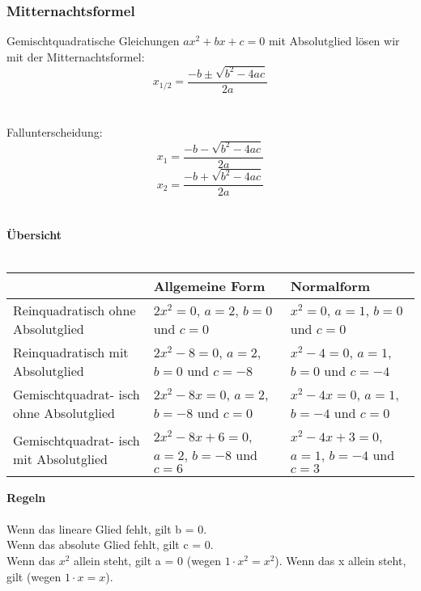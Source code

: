 \begin{multicols}{2}
    \subsubsection{Mitternachtsformel}
    \vspace{-4mm}
    Gemischtquadratische Gleichungen $ax^2 + bx + c = 0$ mit Absolutglied lösen wir mit der Mitternachtsformel:
    \[x_{1/2} = \frac{-b \pm \sqrt{b^2 - 4ac}}{2a}\]\\~\\
    Fallunterscheidung:
    \[x_{1} = \dfrac{-b - \sqrt{b^2 - 4ac}}{2a}\]
    \[x_{2} = \dfrac{-b + \sqrt{b^2 - 4ac}}{2a}\]\\~\\

    \textbf{Übersicht}\\~\\
    \begin{tabularx}{0.5\textwidth} {
            | >{\raggedright\arraybackslash}X
            | >{\raggedright\arraybackslash}X
            | >{\raggedright\arraybackslash}X |}
        \hline
        \textbf{}                               & \textbf{Allgemeine Form}                       & \textbf{Normalform}                           \\ \hline
        Reinquadratisch ohne Absolutglied       & $2x^2 = 0$, $a = 2$, $b = 0$ und $c = 0$       & $x^2 = 0$, $a = 1$, $b = 0$ und $c = 0$       \\\hline
        Reinquadratisch mit Absolutglied        & $2x^2 -8 = 0$, $a = 2$, $b = 0$ und $c = -8$   & $x^2-4 = 0$, $a = 1$, $b = 0$ und $c = -4$    \\ \hline
        Gemischtquadrat- isch ohne Absolutglied & $2x^2-8x = 0$, $a = 2$, $b = -8$ und $c = 0$   & $x^2 -4x= 0$,  $a = 1$, $b = -4$ und $c = 0$  \\ \hline
        Gemischtquadrat- isch mit Absolutglied  & $2x^2-8x+6 = 0$, $a = 2$, $b = -8$ und $c = 6$ & $x^2-4x+3 = 0$, $a = 1$, $b = -4$ und $c = 3$ \\ \hline
    \end{tabularx}

    \textbf{Regeln}\\~\\
    Wenn das lineare Glied fehlt, gilt b = 0. \\
    Wenn das absolute Glied fehlt, gilt c = 0. \\
    Wenn das $x^2$ allein steht, gilt a = 0 (wegen $1 \cdot x^2 = x^2$).
    Wenn das x allein steht, gilt (wegen $1 \cdot x = x$).


\end{multicols}
